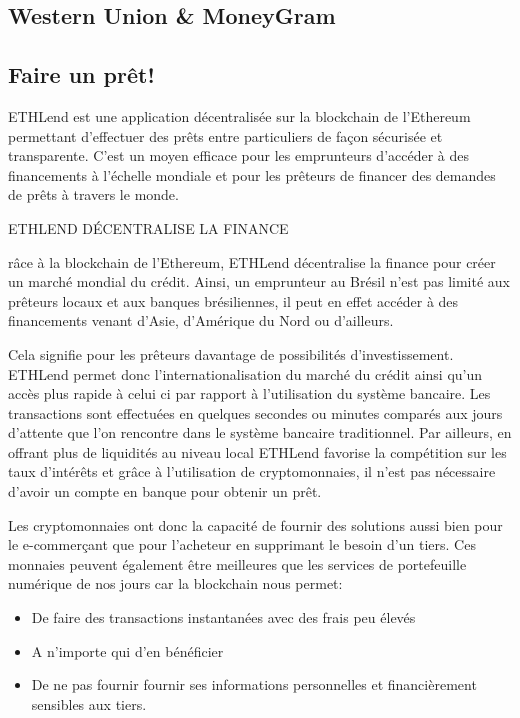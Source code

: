 \documentclass[12pt]{report}
\begin{document}

    \subsection{Western Union \& MoneyGram}


    \subsection{Faire un prêt! }
ETHLend est une application décentralisée sur la blockchain de l’Ethereum permettant d’effectuer des prêts entre particuliers de façon sécurisée et transparente.
C’est un moyen efficace pour les emprunteurs d’accéder à des financements à l’échelle mondiale et pour les prêteurs de financer des demandes de prêts à travers le monde.

ETHLEND DÉCENTRALISE LA FINANCE


râce à la blockchain de l’Ethereum, ETHLend décentralise la finance pour créer un marché mondial du crédit. Ainsi, un emprunteur au Brésil n’est pas limité aux prêteurs locaux et aux banques brésiliennes, il peut en effet accéder à des financements venant d’Asie, d’Amérique du Nord ou d’ailleurs.

Cela signifie pour les prêteurs davantage de possibilités d’investissement. ETHLend permet donc l’internationalisation du marché du crédit ainsi qu’un accès plus rapide à celui ci par rapport à l’utilisation du système bancaire. Les transactions sont effectuées en quelques secondes ou minutes comparés aux jours d’attente que l’on rencontre dans le système bancaire traditionnel.
Par ailleurs, en offrant plus de liquidités au niveau local ETHLend favorise la compétition sur les taux d’intérêts et grâce à l’utilisation de cryptomonnaies, il n’est pas nécessaire d’avoir un compte en banque pour obtenir un prêt.

\hspace{1cm} Les cryptomonnaies ont donc la capacité de fournir des solutions aussi bien pour le e-commerçant que pour l'acheteur en supprimant  le besoin d'un tiers. Ces monnaies peuvent également être meilleures que les services de portefeuille numérique de nos jours car la blockchain nous permet: 
    \begin{itemize}
        \item De faire des transactions instantanées avec des frais peu élevés
        \item A n’importe qui d'en bénéficier
        \item De ne pas fournir fournir ses informations personnelles et financièrement sensibles aux tiers.
    \end{itemize}
\end{document}
